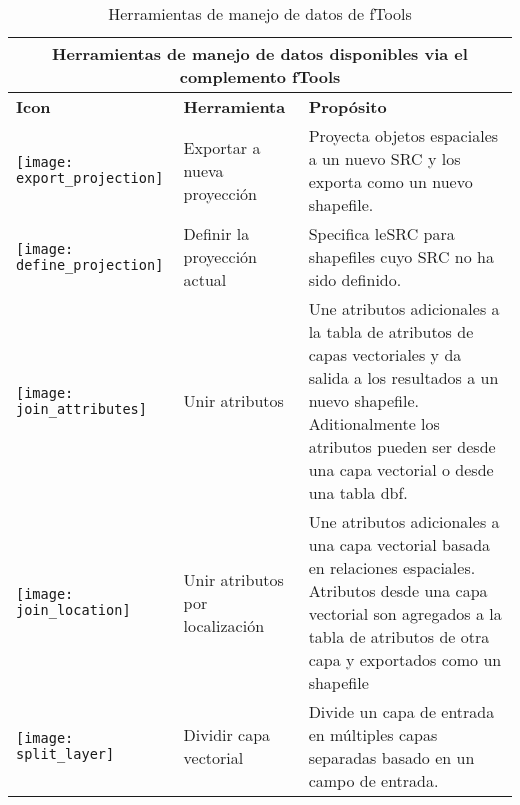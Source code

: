 \begin{table}[ht]
\centering
\caption{Herramientas de manejo de datos de fTools}\label{tab:fTool_data_management}\medskip
 \begin{tabular}{|p{0.3in}|p{1.3in}|p{4.6in}|}
 \hline \multicolumn{3}{|c|}{\textbf{Herramientas de manejo de datos disponibles via el complemento fTools}} \\
 \hline \textbf{Icon} & \textbf{Herramienta} & \textbf{Prop\'osito} \\
 \hline \texttt{[image: export\_projection]} & Exportar a nueva proyecci\'on & 
Proyecta objetos espaciales a un nuevo SRC y los exporta como un nuevo shapefile. \\
 \hline \texttt{[image: define\_projection]} & Definir la proyecci\'on actual & 
Specifica leSRC para shapefiles cuyo SRC no ha sido definido. \\
 \hline \texttt{[image: join\_attributes]} & Unir atributos & Une 
atributos adicionales a la tabla de atributos de capas vectoriales y da salida a los resultados
a un nuevo shapefile. Aditionalmente los atributos pueden ser desde una capa vectorial o 
desde una tabla dbf. \\
 \hline \texttt{[image: join\_location]} & Unir atributos por
localizaci\'on & Une atributos adicionales a una capa vectorial basada en 
relaciones espaciales. Atributos desde una capa vectorial son agregados a la tabla de atributos 
de otra capa y exportados como un shapefile \\
 \hline \texttt{[image: split\_layer]} & Dividir capa vectorial & 
Divide un capa de entrada en m\'ultiples capas separadas basado en un campo de entrada. \\
 \hline
\end{tabular}
\end{table}



